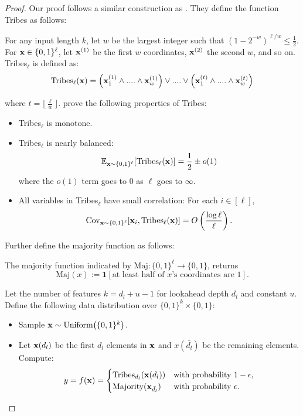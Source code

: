 \begin{proof}
    Our proof follows a similar construction as \cite{topk}. They define the function Tribes as follows: 
    \begin{definition}
        For any input length $k$, let $w$ be the largest integer such that $(1 - 2^{-w})^{\ell/w} \leq \frac{1}{2}$. For $\mathbf{x} \in \{0, 1\}^\ell$, let $\mathbf{x}^{(1)}$ be the first $w$ coordinates, $\mathbf{x}^{(2)}$ the second $w$, and so on. \textrm{\rm Tribes}$_\ell$ is defined as:
        \begin{equation}
            \textrm{Tribes}_\ell(\mathbf{x}) = \left(\mathbf{x}_1^{(1)}\land ....\land \mathbf{x}_w^{(1)}\right) \lor .... \lor \left(\mathbf{x}_1^{(t)}\land ....\land \mathbf{x}_w^{(t)}\right)
        \end{equation}
        \end{definition}
    where $t = \Big\lfloor \frac{\ell}{w}\Big\rfloor$. \cite{blanc2019top} prove the following properties of Tribes: 
    \begin{itemize}
        \item Tribes$_\ell$ is monotone. 
        \item \textrm{Tribes}$_\ell$ is nearly balanced:\[
        \mathbb{E}_{\mathbf{x} \sim \{0,1\}^\ell} [\textrm{Tribes}_\ell(\mathbf{x})] = \frac{1}{2} \pm o(1)\]
        where the $o(1)$ term goes to 0 as $\ell$ goes to $\infty$.
        \item All variables in \textrm{Tribes}$_\ell$ have small correlation: For each $i \in [\ell]$,
        \[
        \text{Cov}_{\mathbf{x} \sim \{0,1\}^\ell} [\mathbf{x}_i, \textrm{Tribes}_\ell(\mathbf{x})] = O\left( \frac{\log \ell}{\ell} \right).
        \]
    \end{itemize}
    Further define the majority function as follows: 
    \begin{definition}[Majority]
        The majority function indicated by $\text{Maj} : \{0, 1\}^\ell \to \{0, 1\}$, returns
        \[
        \text{Maj}(x) := \mathbf{1}[\text{at least half of } x\text{'s coordinates are } 1].
        \]
    \end{definition}
    Let the number of features $k = d_l + u - 1$ for lookahead depth $d_l$ and constant $u$. Define the following data distribution over $\{0,1\}^k \times \{0,1\}$:
\begin{itemize}
    \item Sample $\mathbf{x} \sim \textrm{Uniform}\big(\{0,1\}^k\big)$.
    \item Let $\mathbf{x}(d_l)$ be the first $d_l$ elements in $\mathbf{x}$ and $x(\bar{d_l})$ be the remaining elements. Compute: 
    \begin{align}
    \label{eqn:formulation_tribes_majority}
        y = f(\mathbf{x}) = 
        \begin{cases} 
            \textrm{Tribes}_{d_l}(\mathbf{x}(d_l)) & \text{with probability } 1-\epsilon, \\
            \textrm{Majority}(\mathbf{x}_{\bar{d_l}}) & \text{with probability } \epsilon.
        \end{cases}
    \end{align}
\end{itemize}

\end{proof}
